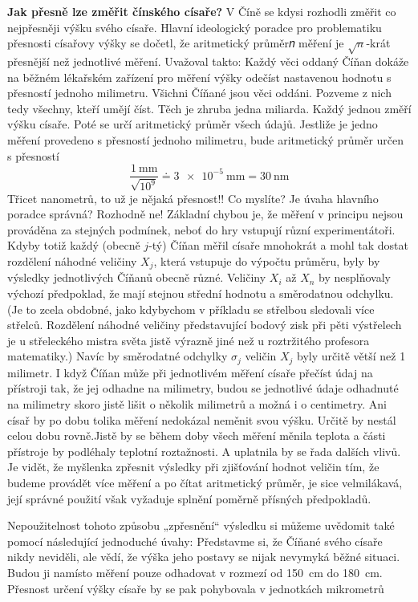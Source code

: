 \wikitextrule
\begin{example}\label{mai:exam074}
  \textbf{Jak přesně lze změřit čínského císaře?}\newline\small
    V Číně se kdysi rozhodli změřit co nejpřesněji výšku svého císaře. Hlavní ideologický poradce 
    pro problematiku přesnosti císařovy výšky se dočetl, že aritmetický průměr𝑛 měření je 
    \(\sqrt{𝑛}\)-krát přesnější než jednotlivé měření. Uvažoval takto: Každý věci oddaný Číňan 
    dokáže na běžném lékařském zařízení pro měření výšky odečíst nastavenou hodnotu s přesností 
    jednoho milimetru. Všichni Číňané jsou věci oddáni. Pozveme z nich tedy všechny, kteří umějí 
    číst. Těch je zhruba jedna miliarda. Každý jednou změří výšku císaře. Poté se určí aritmetický 
    průměr všech údajů. Jestliže je jedno měření provedeno s přesností jednoho milimetru, bude 
    aritmetický průměr určen s přesností 
    \begin{equation*}
      \dfrac{\SI{1}{\mm}}{\sqrt{10^9}}\doteq\SI{3e-5}{\mm} = \SI{30}{\nm}
    \end{equation*}
    Třicet nanometrů, to už je nějaká přesnost!! Co myslíte? Je úvaha hlavního poradce správná? 
    Rozhodně ne! Základní chybou je, že měření v principu nejsou prováděna za stejných podmínek, 
    neboť do hry vstupují různí experimentátoři. Kdyby totiž každý (obecně \(j\)-tý) Číňan měřil 
    císaře mnohokrát a mohl tak dostat rozdělení náhodné veličiny \(X_j\), která vstupuje do 
    výpočtu průměru, byly by výsledky jednotlivých Číňanů obecně různé. Veličiny \(X_i\) až \(X_n\) 
    by nesplňovaly výchozí předpoklad, že mají stejnou střední hodnotu a směrodatnou odchylku. (Je 
    to zcela obdobné, jako kdybychom v příkladu se střelbou sledovali více střelců. Rozdělení 
    náhodné veličiny představující bodový zisk při pěti výstřelech je u střeleckého mistra světa 
    jistě výrazně jiné než u roztržitého profesora matematiky.) Navíc by směrodatné odchylky 
    \(\sigma_j\) veličin \(X_j\) byly určitě větší než 1 milimetr. I když Číňan může při 
    jednotlivém měření císaře přečíst údaj na přístroji tak, že jej odhadne na milimetry, budou se 
    jednotlivé údaje odhadnuté na milimetry skoro jistě lišit o několik milimetrů a možná i o 
    centimetry. Ani císař by po dobu tolika měření nedokázal neměnit svou výšku. Určitě by nestál 
    celou dobu rovně.Jistě by se během doby všech měření měnila teplota a části přístroje by 
    podléhaly teplotní roztažnosti. A uplatnila by se řada dalších vlivů. Je vidět, že myšlenka 
    zpřesnit výsledky při zjišťování hodnot veličin tím, že budeme provádět více měření a po čítat 
    aritmetický průměr, je sice velmilákavá, její správné použití však vyžaduje splnění poměrně 
    přísných předpokladů.
    
    Nepoužitelnost tohoto způsobu „zpřesnění“ výsledku si můžeme uvědomit také pomocí následující 
    jednoduché úvahy: Představme si, že Číňané svého císaře nikdy neviděli, ale vědí, že výška jeho 
    postavy se nijak nevymyká běžné situaci. Budou ji namísto měření pouze odhadovat v rozmezí od 
    \SI{150}{\cm} do \SI{180}{\cm}. Přesnost určení výšky císaře by se pak pohybovala v jednotkách 
    mikrometrů
\normalsize
\end{example}
